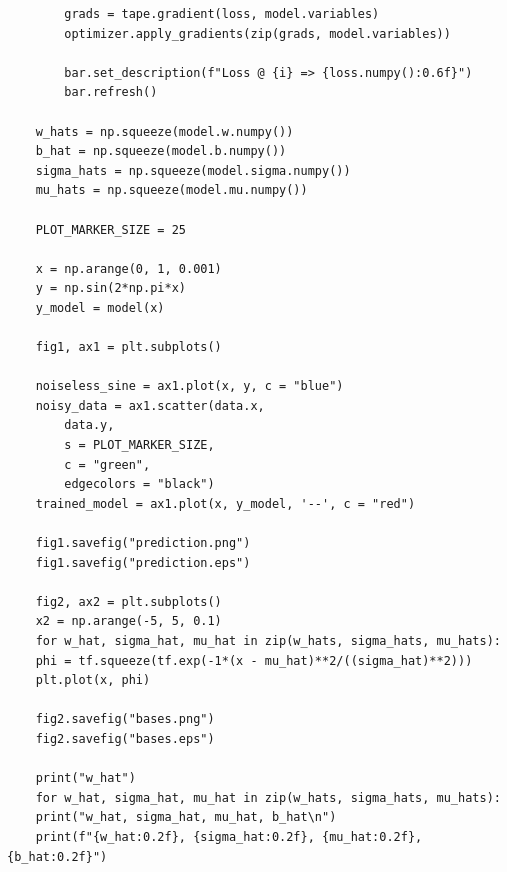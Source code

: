 \documentclass[12pt]{article}
\begin{document}
\begin{adjustwidth}{-50pt}{0pt}
\begin{Verbatim}
		grads = tape.gradient(loss, model.variables)
		optimizer.apply_gradients(zip(grads, model.variables))
		
		bar.set_description(f"Loss @ {i} => {loss.numpy():0.6f}")
		bar.refresh()
	
	w_hats = np.squeeze(model.w.numpy())
	b_hat = np.squeeze(model.b.numpy())
	sigma_hats = np.squeeze(model.sigma.numpy())
	mu_hats = np.squeeze(model.mu.numpy())
	
	PLOT_MARKER_SIZE = 25
	
	x = np.arange(0, 1, 0.001)
	y = np.sin(2*np.pi*x)
	y_model = model(x)
	
	fig1, ax1 = plt.subplots()
	
	noiseless_sine = ax1.plot(x, y, c = "blue")
	noisy_data = ax1.scatter(data.x,
		data.y,
		s = PLOT_MARKER_SIZE,
		c = "green",
		edgecolors = "black")
	trained_model = ax1.plot(x, y_model, '--', c = "red")
	
	fig1.savefig("prediction.png")
	fig1.savefig("prediction.eps")
	
	fig2, ax2 = plt.subplots()
	x2 = np.arange(-5, 5, 0.1)
	for w_hat, sigma_hat, mu_hat in zip(w_hats, sigma_hats, mu_hats):
	phi = tf.squeeze(tf.exp(-1*(x - mu_hat)**2/((sigma_hat)**2)))
	plt.plot(x, phi)
	
	fig2.savefig("bases.png")
	fig2.savefig("bases.eps")
	
	print("w_hat")
	for w_hat, sigma_hat, mu_hat in zip(w_hats, sigma_hats, mu_hats):
	print("w_hat, sigma_hat, mu_hat, b_hat\n")
	print(f"{w_hat:0.2f}, {sigma_hat:0.2f}, {mu_hat:0.2f}, {b_hat:0.2f}")
\end{Verbatim}
\end{adjustwidth}
\end{document}
